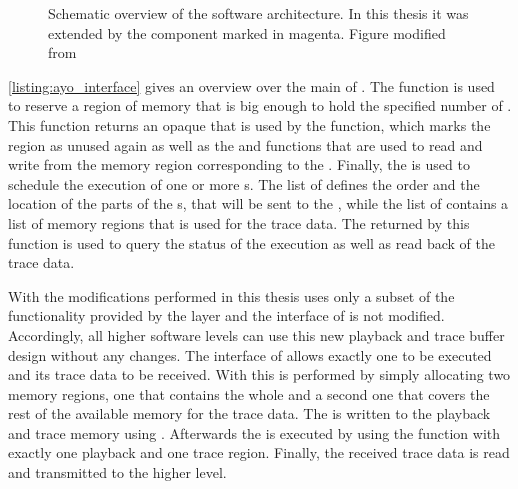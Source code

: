 \begin{figure}[htbp]
\centerline{}
\caption{Schematic overview of the \BSSTwo{} software architecture. In this thesis it was extended by the \ayo{} component marked in magenta. Figure modified from \autocite{mueller2022scalable}}\label{fig:bss_stack}
\end{figure}

\autoref{listing:ayo_interface} gives an overview over the main \API{} of \ayo{}. The  function is used to reserve a region of memory that is big enough to hold the specified number of . This function returns an opaque  that is used by the  function, which marks the region as unused again as well as the  and  functions that are used to read and write from the memory region corresponding to the .
Finally, the  is used to schedule the execution of one or more \PlaybackProgram{}s. The list of  defines the order and the location of the parts of the \PlaybackProgram{}s, that will be sent to the \pbexec{}, while the list of  contains a list of memory regions that is used for the trace data. The  returned by this function is used to query the status of the execution as well as read back of the trace data.

With the modifications performed in this thesis \hxcomm{} uses only a subset of the functionality provided by the \ayo{} layer and the interface of \hxcomm{} is not modified. Accordingly, all higher software levels can use this new playback and trace buffer design without any changes.
The interface of \hxcomm{} allows exactly one \PlaybackProgram{} to be executed and its trace data to be received. With \ayo{} this is performed by simply allocating two memory regions, one that contains the whole \PlaybackProgram{} and a second one that covers the rest of the available memory for the trace data. The \PlaybackProgram{} is written to the playback and trace memory using . Afterwards the \PlaybackProgram{} is executed by using the  function with exactly one playback and one trace region. Finally, the received trace data is read and transmitted to the higher level.

